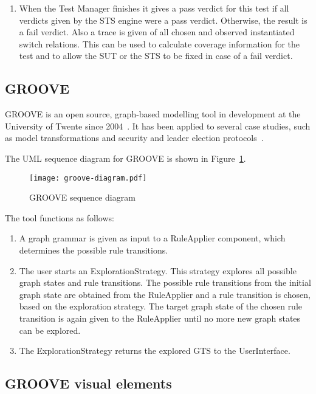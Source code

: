 \begin{enumerate}
  \item When the Test Manager finishes it gives a pass verdict for this test if all verdicts given by the STS engine were a pass verdict. Otherwise, the result is a fail verdict. Also a trace is given of all chosen and observed instantiated switch relations. This can be used to calculate coverage information for the test and to allow the SUT or the STS to be fixed in case of a fail verdict.
\end{enumerate}

\subsection{GROOVE}\label{sec:descriptiongroove}
GROOVE is an open source, graph-based modelling tool in development at the University of Twente since 2004~\cite{Rensink:GROOVE}. It has been applied to several case studies, such as model transformations and security and leader election protocols~\cite{Ghamarian:GROOVE}.

The UML sequence diagram for GROOVE is shown in Figure~\ref{fig:groove_tool}.

\begin{figure}[h]
  \begin{center}
    \texttt{[image: groove-diagram.pdf]}
  \end{center}
  \caption{GROOVE sequence diagram}
  \label{fig:groove_tool}
\end{figure}

The tool functions as follows:
\begin{enumerate}
\item A graph grammar is given as input to a RuleApplier component, which determines the possible rule transitions.
\item The user starts an ExplorationStrategy. This strategy explores all possible graph states and rule transitions. The possible rule transitions from the initial graph state are obtained from the RuleApplier and a rule transition is chosen, based on the exploration strategy. The target graph state of the chosen rule transition is again given to the RuleApplier until no more new graph states can be explored.
\item The ExplorationStrategy returns the explored GTS to the UserInterface.
\end{enumerate}

\subsection{GROOVE visual elements}
